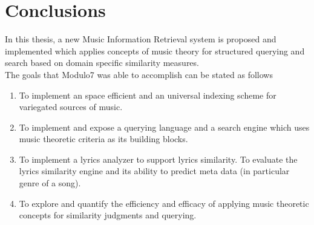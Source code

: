 \chapter{Conclusions}

\noindent In this thesis, a new Music Information Retrieval system is proposed and implemented which applies concepts of music theory for structured querying and search based on domain specific similarity measures. \\

\noindent The goals that Modulo7 was able to accomplish can be stated as follows
\begin{enumerate}
\item To implement an space efficient and an universal indexing scheme for variegated sources of music.
\item To implement and expose a querying language and a search engine  which uses music theoretic criteria as its building blocks. 
\item To implement a lyrics analyzer to support lyrics similarity. To evaluate the lyrics similarity engine and its ability to predict meta data (in particular genre of a song).  
\item To explore and quantify the efficiency and efficacy of applying music theoretic concepts for similarity judgments and querying.
\end{enumerate} 

